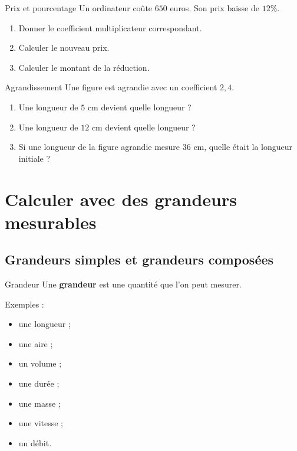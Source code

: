 \documentclass[11pt,a4paper]{article}
\begin{document}
\begin{exercisebox}{Prix et pourcentage}
Un ordinateur coûte $650$ euros. Son prix baisse de $12\%$.

\begin{enumerate}
    \item Donner le coefficient multiplicateur correspondant.
    \item Calculer le nouveau prix.
    \item Calculer le montant de la réduction.
\end{enumerate}
\end{exercisebox}

\begin{exercisebox}{Agrandissement}
Une figure est agrandie avec un coefficient $2{,}4$.

\begin{enumerate}
    \item Une longueur de $5$ cm devient quelle longueur ?
    \item Une longueur de $12$ cm devient quelle longueur ?
    \item Si une longueur de la figure agrandie mesure $36$ cm, quelle était la longueur initiale ?
\end{enumerate}
\end{exercisebox}

\newpage

\section{Calculer avec des grandeurs mesurables}

\subsection{Grandeurs simples et grandeurs composées}

\begin{definitionbox}{Grandeur}
Une \textbf{grandeur} est une quantité que l'on peut mesurer.

Exemples :
\begin{itemize}
    \item une longueur ;
    \item une aire ;
    \item un volume ;
    \item une durée ;
    \item une masse ;
    \item une vitesse ;
    \item un débit.
\end{itemize}
\end{definitionbox}
\end{document}
